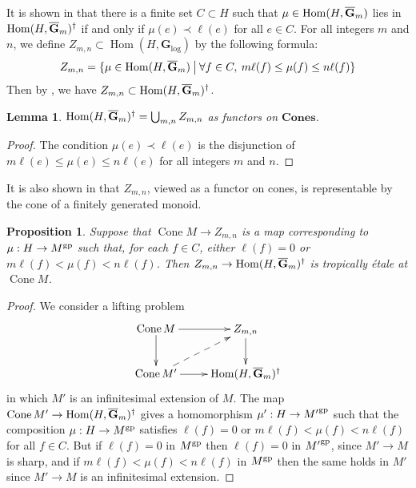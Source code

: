 \documentclass[12pt]{amsart}
\newtheorem{proposition}[theorem]{Proposition}
\newtheorem{lemma}[theorem]{Lemma}
\theoremstyle{definition}
\theoremstyle{remark}
\def\Hom{\operatorname{Hom}}
\def\Cone{\operatorname{Cone}}
\def\Cones{\mathbf{Cones}}
\def\logGm{\mathbf{G}_{\log}}
\def\overnorm#1{\overline{#1}\vphantom{#1}}
\def\ologGm{\overnorm{\mathbf G}_m}
\begin{document}
It is shown in \cite[Lemma~3.10.3.1]{logpic} that there is a finite set $C \subset H$ such that $\mu \in \Hom(H, \ologGm)$ lies in $\Hom(H, \ologGm)^\dagger$ if and only if $\mu(e) \prec \ell(e)$ for all $e \in C$.  For all integers $m$ and $n$, we define $Z_{m,n} \subset \Hom(H, \logGm)$ by the following formula:
\begin{equation} \label{eqn:6}
Z_{m,n} = \{ \mu \in \Hom(H, \ologGm) \: \big| \: \forall f \in C, \: m \ell(f) \leq \mu(f) \leq n \ell(f) \}
\end{equation}
Then by \cite[Lemma~3.10.3.1]{logpic}, we have $Z_{m,n} \subset \Hom(H, \ologGm)^\dagger$.

\begin{lemma} \label{lem:cover}
$\Hom(H, \ologGm)^\dagger = \bigcup_{m,n} Z_{m,n}$ as functors on $\Cones$.
\end{lemma}
\begin{proof}
The condition $\mu(e) \prec \ell(e)$ is the disjunction of $m \ell(e) \leq \mu(e) \leq n \ell(e)$ for all integers $m$ and $n$.
\end{proof}

It is also shown in \cite[Lemma~3.10.3.2]{logpic} that $Z_{m,n}$, viewed as a functor on cones, is representable by the cone of a finitely generated monoid.

\begin{proposition} \label{prop:Z-etale}
Suppose that $\Cone M \to Z_{m,n}$ is a map corresponding to $\mu : H \to M^{\rm gp}$ such that, for each $f \in C$, either $\ell(f) = 0$ or $m \ell(f) < \mu(f) < n \ell(f)$.  Then $Z_{m,n} \to \Hom(H, \ologGm)^\dagger$ is tropically \'etale at $\Cone M$.
\end{proposition}
\begin{proof}
We consider a lifting problem
\begin{equation} \vcenter{\xymatrix{
\Cone M \ar[r] \ar[d] & Z_{m,n} \ar[d] \\
\Cone M' \ar@{-->}[ur] \ar[r] &  \Hom(H, \ologGm)^\dagger
}} \end{equation}
in which $M'$ is an infinitesimal extension of $M$.  The map $\Cone M' \to \Hom(H, \ologGm)^\dagger$ gives a homomorphism $\mu' : H \to {M'}^{\rm gp}$ such that the composition $\mu : H \to M^{\rm gp}$ satisfies $\ell(f) = 0$ or $m \ell(f) < \mu(f) < n \ell(f)$ for all $f \in C$.  But if $\ell(f) = 0$ in $M^{\rm gp}$ then $\ell(f) = 0$ in ${M'}^{\rm gp}$, since $M' \to M$ is sharp, and if $m \ell(f) < \mu(f) < n \ell(f)$ in $M^{\rm gp}$ then the same holds in $M'$ since $M' \to M$ is an infinitesimal extension.
\end{proof}
\end{document}
